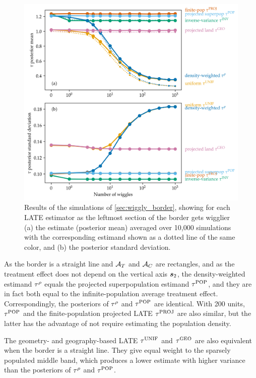 \begin{figure}[!tb]
	\centering
	\includegraphics[height=0.6\textheight]{../figures/wiggly_boundaries_posteriors.png}
	\caption{
		\label{fig:wiggly_boundaries_posteriors}
		Results of the simulations of \autoref{sec:wiggly_border}, showing for each LATE estimator as the leftmost section of the border gets wigglier (a) the estimate (posterior mean) averaged over 10,000 simulations with the corresponding estimand shown as a dotted line of the same color, and (b) the posterior standard deviation.
	}
\end{figure}
    
	As the border is a straight line and \(\mathcal{A}{}_{T}\) and \(\mathcal{A}{}_{C}\) are rectangles,
and as the treatment effect does not depend on the vertical axis \(\bm{s}_2\),
the density-weighted estimand \(\tau^{\rho}\) equals the projected superpopulation estimand \(\tau^{\mathrm{POP}}\),
and they are in fact both equal to the infinite-population average treatment effect.
Correspondingly, the posteriors of \(\tau^{\rho}\) and \(\tau^{\mathrm{POP}}\) are identical.
With 200 units, \(\tau^{\mathrm{POP}}\) and the finite-population projected LATE \(\tau^{\mathrm{PROJ}}\) are also similar, but the latter has the advantage of not require estimating the population density.

	The geometry- and geography-based LATE \(\tau^{\mathrm{UNIF}}\) and \(\tau^{\mathrm{GEO}}\) are also equivalent when the border is a straight line.
They give equal weight to the sparsely populated middle band, which produces a lower estimate with higher variance than the posteriors of \(\tau^{\rho}\) and \(\tau^{\mathrm{POP}}\).

